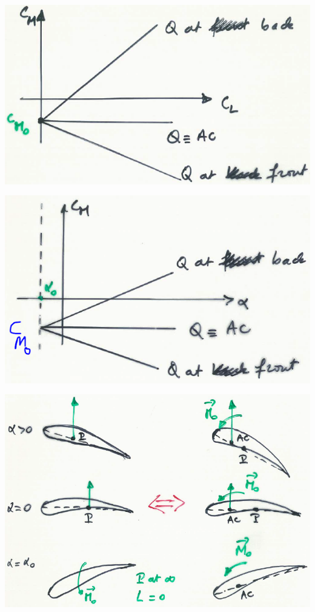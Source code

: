 			\begin{center}
			\begin{minipage}{0.33\textwidth}
			\includegraphics[scale=0.33]{ch2/14}
			\end{minipage}
			\begin{minipage}{0.32\textwidth}
			\includegraphics[scale=0.32]{ch2/15}
			\end{minipage}
			\begin{minipage}{0.32\textwidth}
			\includegraphics[scale=0.21]{ch2/16}
			\end{minipage}
			\end{center}
		

